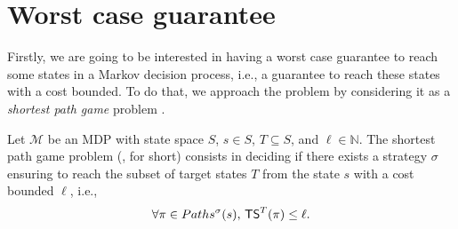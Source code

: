\section{Worst case guarantee}
Firstly, we are going to be interested in having a worst case guarantee to reach some states in a Markov decision process, i.e., a guarantee to reach these states with a cost bounded.
To do that, we approach the problem by considering it as a \textit{shortest path game} problem \cite{DBLP:journals/corr/RandourRS14a}.
\begin{definition}
  Let $\mathcal{M}$ be an MDP with state space $S$, $s \in S$, $T \subseteq S$, and $\ell \in \mathbb{N}$.
  The shortest path game problem (\SPG{}, for short) consists in deciding if there exists a strategy $\sigma$ ensuring to reach the subset of target states $T$ from the state $s$ with a cost bounded $\ell$, i.e.,
  \begin{align*}
    \forall \pi \in Paths^\sigma(s), \, \text{\sffamily TS}^T(\pi) \leq \ell.
  \end{align*}
\end{definition}

